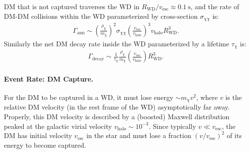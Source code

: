 \documentclass[preprintnumbers,amsmath,amssymb,prd,superscriptaddress]{revtex4}
\def\r{\right)}
\def\l{\left(}
\begin{document}
DM that is not captured traverses the WD in $R_\text{WD}/v_\text{esc} \approx 0.1 ~\text{s}$, and the rate of DM-DM collisions within the WD parameterized by cross-section $\sigma_{\chi \chi}$ is:
\begin{align}
  \Gamma_\text{ann}
  \sim \l \frac{\rho_\chi}{m_\chi} \r^2 \sigma_{\chi \chi} \l \frac{v_\text{esc}}{v_\text{halo}}\r^3 v_\text{halo} R_\text{WD}^3. 
  \label{eq:collisionDM}
\end{align}
Similarly the net DM decay rate inside the WD parameterized by a lifetime $\tau_\chi$ is:
\begin{align}
 \Gamma_\text{decay}
   \sim \frac{1}{\tau_\chi} \frac{\rho_{\chi}}{m_\chi} \l \frac{v_\text{esc}}{v_\text{halo}}\r R_\text{WD}^3.
  \label{eq:decayDM}
\end{align}

\paragraph{Event Rate: DM Capture.}
For the DM to be captured in a WD, it must lose energy $\sim m_\chi v^2$, where $v$ is the relative DM velocity (in the rest frame of the WD) asymptotically far away.
Properly, this DM velocity is described by a (boosted) Maxwell distribution peaked at the galactic virial velocity $v_\text{halo} \sim 10^{-3}$. 
Since typically $v \ll v_\text{esc}$, the DM has initial velocity $v_\text{esc}$ in the star and must lose a fraction $(v/v_\text{esc})^2$ of its energy to become captured. 
\end{document}

